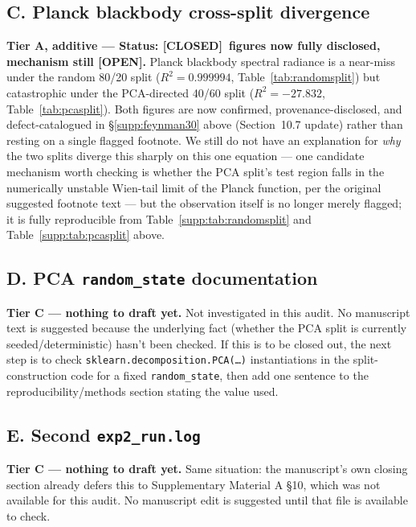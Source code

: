 \documentclass[11pt]{article}
\newcommand{\open}{\textcolor{red!60!black}{\textbf{[OPEN]}}}
\newcommand{\closed}{\textcolor{green!40!black}{\textbf{[CLOSED]}}}
\newcommand{\Rsq}{R^{2}}
\begin{document}
\subsection*{C. Planck blackbody cross-split divergence}
\label{supp:edit-C}

\textbf{Tier A, additive --- Status: \closed\ figures now fully disclosed,
mechanism still \open.} Planck blackbody spectral radiance is a
near-miss under the random 80/20 split ($\Rsq=0.999994$,
Table~\ref{tab:randomsplit}) but catastrophic under the PCA-directed
40/60 split ($\Rsq=-27.832$, Table~\ref{tab:pcasplit}). Both figures are
now confirmed, provenance-disclosed, and defect-catalogued in
\S\ref{supp:feynman30} above (Section~10.7 update) rather than resting on
a single flagged footnote. We still do not have an explanation for
\emph{why} the two splits diverge this sharply on this one equation ---
one candidate mechanism worth checking is whether the PCA split's test
region falls in the numerically unstable Wien-tail limit of the Planck
function, per the original suggested footnote text --- but the
observation itself is no longer merely flagged; it is fully reproducible
from Table~\ref{supp:tab:randomsplit} and Table~\ref{supp:tab:pcasplit}
above.

\subsection*{D. PCA \texttt{random\_state} documentation}

\textbf{Tier C --- nothing to draft yet.} Not investigated in this audit.
No manuscript text is suggested because the underlying fact (whether the
PCA split is currently seeded/deterministic) hasn't been checked. If this
is to be closed out, the next step is to check
\texttt{sklearn.decomposition.PCA(\ldots)} instantiations in the
split-construction code for a fixed \texttt{random\_state}, then add one
sentence to the reproducibility/methods section stating the value used.

\subsection*{E. Second \texttt{exp2\_run.log}}

\textbf{Tier C --- nothing to draft yet.} Same situation: the
manuscript's own closing section already defers this to Supplementary
Material A \S10, which was not available for this audit. No manuscript
edit is suggested until that file is available to check.
\end{document}
